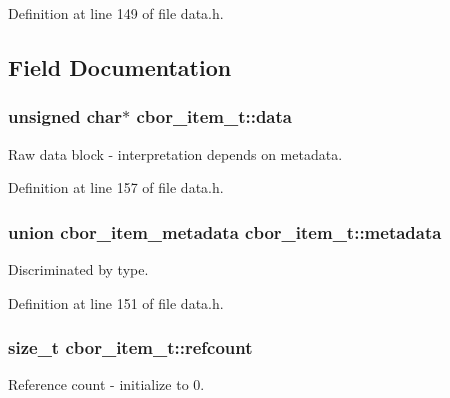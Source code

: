 Definition at line 149 of file data.\-h.



\subsection{Field Documentation}
\hypertarget{structcbor__item__t_a5c6dde1dbef5aad748c49786352eef44}{
\subsubsection[{data}]{\setlength{\rightskip}{0pt plus 5cm}unsigned char$\ast$ cbor\-\_\-item\-\_\-t\-::data}}\label{structcbor__item__t_a5c6dde1dbef5aad748c49786352eef44}


Raw data block -\/ interpretation depends on metadata. 



Definition at line 157 of file data.\-h.

\hypertarget{structcbor__item__t_a7d97fa5cdf027ca0499c37ec19acf843}{
\subsubsection[{metadata}]{\setlength{\rightskip}{0pt plus 5cm}union {\bf cbor\-\_\-item\-\_\-metadata} cbor\-\_\-item\-\_\-t\-::metadata}}\label{structcbor__item__t_a7d97fa5cdf027ca0499c37ec19acf843}


Discriminated by type. 



Definition at line 151 of file data.\-h.

\hypertarget{structcbor__item__t_a6bb24fe655f086c6aa9a66d427e09cca}{
\subsubsection[{refcount}]{\setlength{\rightskip}{0pt plus 5cm}size\-\_\-t cbor\-\_\-item\-\_\-t\-::refcount}}\label{structcbor__item__t_a6bb24fe655f086c6aa9a66d427e09cca}


Reference count -\/ initialize to 0. 



